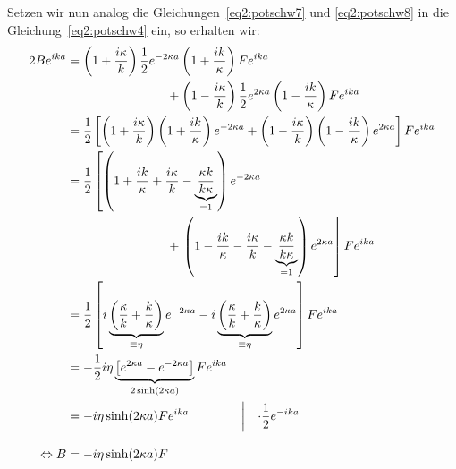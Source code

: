 Setzen wir nun analog die Gleichungen~\eqref{eq2:potschw7} und
\eqref{eq2:potschw8} in die Gleichung~\eqref{eq2:potschw4} ein, so erhalten wir:
{\allowdisplaybreaks
\begin{align}
   2Be^{ika} & = \left(1+\frac{i\kappa}{k}\right)
                   \frac{1}{2}e^{-2\kappa a}
                   \left(1+\frac{ik}{\kappa}\right)Fe^{ika}\notag \\
                 &\qquad \qquad \qquad \qquad
                 +\left(1-\frac{i\kappa}{k}\right)
                    \frac{1}{2}e^{2\kappa a}
                   \left(1-\frac{ik}{\kappa}\right)Fe^{ika} \notag \\
              & = \frac{1}{2}\left[\left(1+\frac{i\kappa}{k}\right)
                     \left(1+\frac{ik}{\kappa}\right)
                     e^{-2\kappa a}
                     +\left(1-\frac{i\kappa}{k}\right)
                     \left(1-\frac{ik}{\kappa}\right)
                     e^{2\kappa a}\right]
                     Fe^{ika} \notag \\
              & = \frac{1}{2}\left[
                     \left(1+\frac{ik}{\kappa}
                             +\frac{i\kappa}{k}
                             -\underbrace{\frac{\kappa k}{k \kappa}}_{=1}\right)
                     e^{-2\kappa a}\right.\notag\\
                   &\qquad \qquad \qquad \qquad
                     +\left.\left(1-\frac{ik}{\kappa}
                             -\frac{i\kappa}{k}
                             -\underbrace{\frac{\kappa k}{k \kappa}}_{=1}\right)
                     e^{2\kappa a}\right]
                     Fe^{ika} \notag \\
              & = \frac{1}{2}\left[
                     i\underbrace{\left(\frac{\kappa}{k}
                             +\frac{k}{\kappa}\right)}_{\equiv\eta}
                     e^{-2\kappa a}
                     -i\underbrace{\left(\frac{\kappa}{k}
                             +\frac{k}{\kappa}\right)}_{\equiv\eta}
                     e^{2\kappa a}\right]
                     Fe^{ika} \notag \\
              & = -\frac{1}{2} i \eta 
                     \underbrace {\left[
                     e^{2\kappa a} - e^{-2\kappa a}\right]}_
                     {2 \sinh(2 \kappa a)}
                     Fe^{ika} \notag \\
              & = -i \eta \sinh(2 \kappa a)
                     Fe^{ika} \qquad \qquad \left| \quad
                       \cdot \frac{1}{2}e^{-ika}\right. \notag\\[2ex]
\Leftrightarrow B & = -i \eta \sinh(2 \kappa a) F
\end{align}
}

